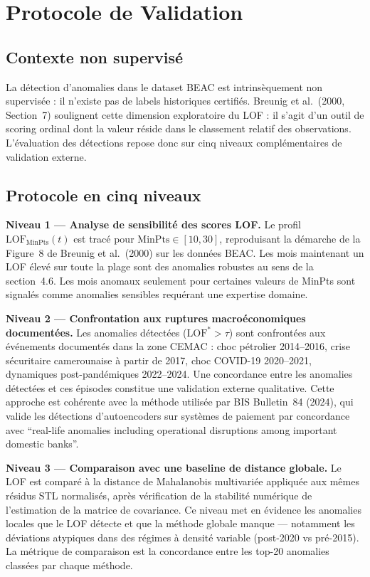 \documentclass[12pt,a4paper]{article}
\begin{document}
\section{Protocole de Validation}

\subsection{Contexte non supervisé}

La détection d'anomalies dans le dataset BEAC est intrinsèquement non
supervisée : il n'existe pas de labels historiques certifiés. Breunig et al.\
(2000, Section~7) soulignent cette dimension exploratoire du LOF : il s'agit
d'un outil de scoring ordinal dont la valeur réside dans le classement relatif
des observations. L'évaluation des détections repose donc sur cinq niveaux
complémentaires de validation externe.

\subsection{Protocole en cinq niveaux}

\textbf{Niveau 1 --- Analyse de sensibilité des scores LOF.}
Le profil $\mathrm{LOF}_{\mathrm{MinPts}}(t)$ est tracé pour
$\mathrm{MinPts} \in [10, 30]$, reproduisant la démarche de la Figure~8
de Breunig et al.\ (2000) sur les données BEAC. Les mois maintenant un LOF
élevé sur toute la plage sont des anomalies robustes au sens de la
section~4.6. Les mois anomaux seulement pour certaines valeurs de MinPts
sont signalés comme anomalies sensibles requérant une expertise domaine.

\textbf{Niveau 2 --- Confrontation aux ruptures macroéconomiques documentées.}
Les anomalies détectées ($\mathrm{LOF}^* > \tau$) sont confrontées aux
événements documentés dans la zone CEMAC : choc pétrolier 2014--2016, crise
sécuritaire camerounaise à partir de 2017, choc COVID-19 2020--2021, dynamiques
post-pandémiques 2022--2024. Une concordance entre les anomalies détectées et
ces épisodes constitue une validation externe qualitative. Cette approche est
cohérente avec la méthode utilisée par BIS Bulletin~84 (2024), qui valide les
détections d'autoencoders sur systèmes de paiement par concordance avec
``real-life anomalies including operational disruptions among important domestic
banks''.

\textbf{Niveau 3 --- Comparaison avec une baseline de distance globale.}
Le LOF est comparé à la distance de Mahalanobis multivariée appliquée aux
mêmes résidus STL normalisés, après vérification de la stabilité numérique
de l'estimation de la matrice de covariance. Ce niveau met en évidence les
anomalies locales que le LOF détecte et que la méthode globale manque ---
notamment les déviations atypiques dans des régimes à densité variable
(post-2020 vs pré-2015). La métrique de comparaison est la concordance entre
les top-20 anomalies classées par chaque méthode.
\end{document}
